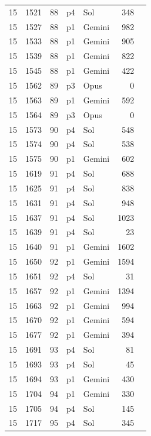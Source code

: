 \begin{longtable}{r r r l l r L{2.3in}}
15 & 1521 & 88 & p4 & Sol & 348 &  \\
15 & 1527 & 88 & p1 & Gemini & 982 &  \\
15 & 1533 & 88 & p1 & Gemini & 905 &  \\
15 & 1539 & 88 & p1 & Gemini & 822 &  \\
15 & 1545 & 88 & p1 & Gemini & 422 &  \\
15 & 1562 & 89 & p3 & Opus & 0 &  \\
15 & 1563 & 89 & p1 & Gemini & 592 &  \\
15 & 1564 & 89 & p3 & Opus & 0 &  \\
15 & 1573 & 90 & p4 & Sol & 548 &  \\
15 & 1574 & 90 & p4 & Sol & 538 &  \\
15 & 1575 & 90 & p1 & Gemini & 602 &  \\
15 & 1619 & 91 & p4 & Sol & 688 &  \\
15 & 1625 & 91 & p4 & Sol & 838 &  \\
15 & 1631 & 91 & p4 & Sol & 948 &  \\
15 & 1637 & 91 & p4 & Sol & 1023 &  \\
15 & 1639 & 91 & p4 & Sol & 23 &  \\
15 & 1640 & 91 & p1 & Gemini & 1602 &  \\
15 & 1650 & 92 & p1 & Gemini & 1594 &  \\
15 & 1651 & 92 & p4 & Sol & 31 &  \\
15 & 1657 & 92 & p1 & Gemini & 1394 &  \\
15 & 1663 & 92 & p1 & Gemini & 994 &  \\
15 & 1670 & 92 & p1 & Gemini & 594 &  \\
15 & 1677 & 92 & p1 & Gemini & 394 &  \\
15 & 1691 & 93 & p4 & Sol & 81 &  \\
15 & 1693 & 93 & p4 & Sol & 45 &  \\
15 & 1694 & 93 & p1 & Gemini & 430 &  \\
15 & 1704 & 94 & p1 & Gemini & 330 &  \\
15 & 1705 & 94 & p4 & Sol & 145 &  \\
15 & 1717 & 95 & p4 & Sol & 345 &  \\

\end{longtable}
